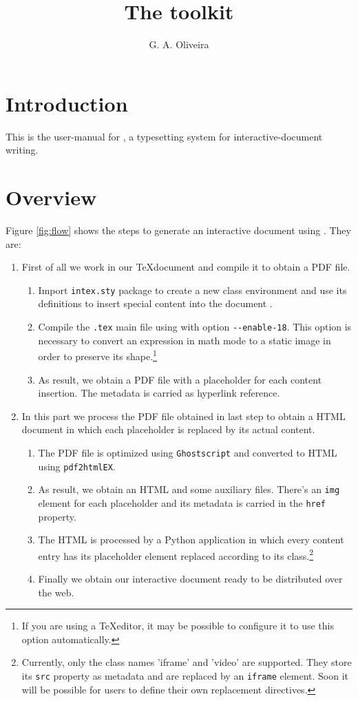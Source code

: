 \documentclass[10pt,a4paper]{article}
\author{G. A. Oliveira}
\title{The \intexs toolkit}
\begin{document}
\maketitle
\section{Introduction}
This is the user-manual for \intex, a typesetting system for interactive-document writing.
\section{Overview}
Figure \ref{fig:flow} shows the steps to generate an interactive document using \intex. They are:
\begin{enumerate}[label*=\arabic*.]
	\item First of all we work in our \TeX\space document and compile it to obtain a PDF file.
	\begin{enumerate}[label*=\arabic*.]
		\item Import \verb|intex.sty| package to create a new class environment and use its definitions to insert special content into the document .
		\item Compile the \verb|.tex| main file using  with option \verb|--enable-18|. This option is necessary to convert an expression in math mode to a static image in order to preserve its shape.\footnote{If you are using a \TeX\space editor, it may be possible to configure it to use this option automatically.}
		\item As result, we obtain a PDF file with a placeholder for each content insertion. The metadata is carried as hyperlink reference.
	\end{enumerate}
	\item In this part we process the PDF file obtained in last step to obtain a HTML document in which each placeholder is replaced by its actual content.
	\begin{enumerate}[label*=\arabic*.]
		\item The PDF file is optimized using \verb|Ghostscript| and converted to HTML using \verb|pdf2htmlEX|.
		\item As result, we obtain an HTML and some auxiliary files. There's an \verb|img| element for each placeholder and its metadata is carried in the \verb|href| property.
		\item The HTML is processed by a Python application in which every content entry has its placeholder element replaced according to its class.\footnote{Currently, only the class names 'iframe' and 'video' are supported. They store its \verb|src| property as metadata and are replaced by an \verb|iframe| element. Soon it will be possible for users to define their own replacement directives.}
		\item Finally we obtain our interactive document ready to be distributed over the web.
	\end{enumerate}
\end{enumerate}
\end{document}
